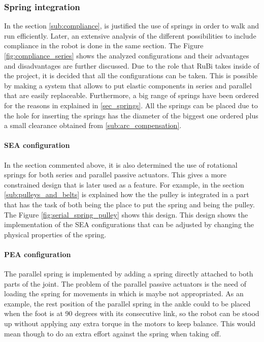 \subsubsection{Spring integration} %


\label{ssub:spring_integration}
In the section \ref{sub:compliance}, is justified the use of springs in order to walk and run efficiently. 
Later, an extensive analysis of the different possibilities to include compliance in the robot is done in the same section.
The Figure \ref{fig:compliance_series} shows the analyzed configurations and their advantages and disadvantages are further discussed.
Due to the role that RuBi takes inside of the project, it is decided that all the configurations can be taken.
This is possible by making a system that allows to put elastic components in series and parallel that are easily replaceable.
Furthermore, a big range of springs have been ordered for the reasons in explained in \ref{sec_springs}.
All the springs can be placed due to the hole for inserting the springs has the diameter of the biggest one ordered plus a small clearance obtained from \ref{sub:arc_compensation}.

\paragraph{SEA configuration} %
\label{para:sea_configuration}

In the section commented above, it is also determined the use of rotational springs for both series and parallel passive actuators.
This gives a more constrained design that is later used as a feature.
For example, in the section \ref{sub:pulleys_and_belts} is explained how the the pulley is integrated in a part that has the task of both being the place to put the spring and being the pulley.
The Figure \ref{fig:serial_spring_pulley} shows this design.
This design shows the implementation of the SEA configurations that can be adjusted by changing the physical properties of the spring.

\paragraph{PEA configuration} %
\label{para:pea_configuration}

The parallel spring is implemented by adding a spring directly attached to both parts of the joint.
The problem of the parallel passive actuators is the need of loading the spring for movements in which is maybe not appropriated.
As an example, the rest position of the parallel spring in the ankle could to be placed when the foot is at 90 degrees with its consecutive link, so the robot can be stood up without applying any extra torque in the motors to keep balance.
This would mean though to do an extra effort against the spring when taking off.

